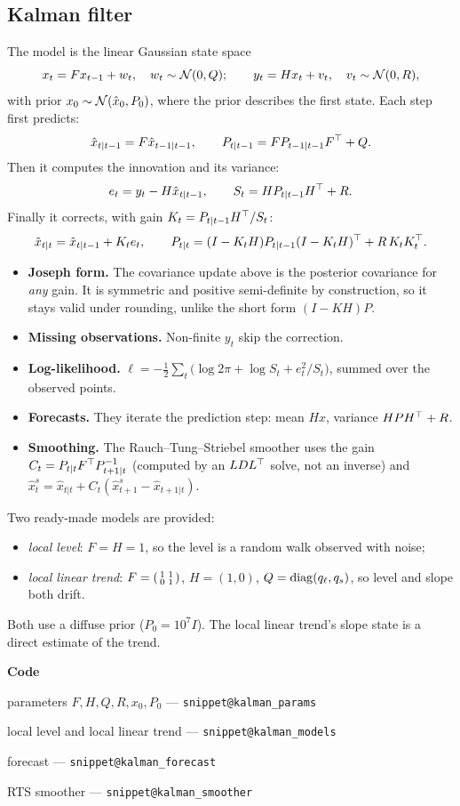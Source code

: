 \documentclass[11pt,a4paper]{article}
\makeatletter
\newcommand{\snippetsource}[1]{\csname snippet@#1\endcsname}
\newcommand{\snippet}[3]{%
  }
\newenvironment{codepointers}{%
  \par\smallskip\begingroup\footnotesize\noindent\textcolor{blue!50!black}{\textbf{Code}}\par\nopagebreak
  \begin{list}{}{\setlength{\leftmargin}{1.2em}\setlength{\itemsep}{0pt}\setlength{\parsep}{0pt}\setlength{\topsep}{1pt}}}%
  {\end{list}\endgroup\smallskip}
\newcommand{\codeitem}[2]{\item #2 --- \texttt{\snippetsource{#1}}}
\makeatother
\begin{document}
\subsection{Kalman filter}
The model is the linear Gaussian state space
\[
  x_t=Fx_{t-1}+w_t,\quad w_t\sim\mathcal{N}(0,Q);\qquad y_t=Hx_t+v_t,\quad v_t\sim\mathcal{N}(0,R),
\]
with prior $x_0\sim\mathcal{N}(\hat x_0,P_0)$, where the prior describes the first state. Each step
first predicts:
\[
  \hat x_{t|t-1}=F\hat x_{t-1|t-1},\qquad P_{t|t-1}=FP_{t-1|t-1}F^\top+Q .
\]
Then it computes the innovation and its variance:
\[
  e_t=y_t-H\hat x_{t|t-1},\qquad S_t=HP_{t|t-1}H^\top+R .
\]
Finally it corrects, with gain $K_t=P_{t|t-1}H^\top/S_t$:
\[
  \hat x_{t|t}=\hat x_{t|t-1}+K_te_t,\qquad
  P_{t|t}=(I-K_tH)P_{t|t-1}(I-K_tH)^\top+R\,K_tK_t^\top .
\]
\begin{itemize}
  \item \textbf{Joseph form.} The covariance update above is the posterior covariance for
        \emph{any} gain. It is symmetric and positive semi-definite by construction, so it
        stays valid under rounding, unlike the short form $(I-KH)P$.
  \item \textbf{Missing observations.} Non-finite $y_t$ skip the correction.
  \item \textbf{Log-likelihood.}
        $\ell=-\tfrac12\sum_t\big(\log2\pi+\log S_t+e_t^2/S_t\big)$, summed over the observed
        points.
  \item \textbf{Forecasts.} They iterate the prediction step: mean $Hx$, variance
        $HPH^\top+R$.
  \item \textbf{Smoothing.} The Rauch--Tung--Striebel smoother uses the gain
        $C_t=P_{t|t}F^\top P_{t+1|t}^{-1}$ (computed by an $LDL^\top$ solve, not an inverse) and
        $\hat x^s_t=\hat x_{t|t}+C_t(\hat x^s_{t+1}-\hat x_{t+1|t})$.
\end{itemize}

Two ready-made models are provided:
\begin{itemize}
  \item \emph{local level}: $F=H=1$, so the level is a random walk observed with noise;
  \item \emph{local linear trend}: $F=\begin{psmallmatrix}1&1\\0&1\end{psmallmatrix}$,
        $H=(1,0)$, $Q=\operatorname{diag}(q_\ell,q_s)$, so level and slope both drift.
\end{itemize}
Both use a diffuse prior ($P_0=10^7I$). The local linear trend's slope state is a direct
estimate of the trend.
\snippet{kalman_step}{C++}{Kalman predict and Joseph-form correction}
\begin{codepointers}
  \codeitem{kalman_params}{parameters $F,H,Q,R,x_0,P_0$}
  \codeitem{kalman_models}{local level and local linear trend}
  \codeitem{kalman_forecast}{forecast}
  \codeitem{kalman_smoother}{RTS smoother}
\end{codepointers}
\end{document}
